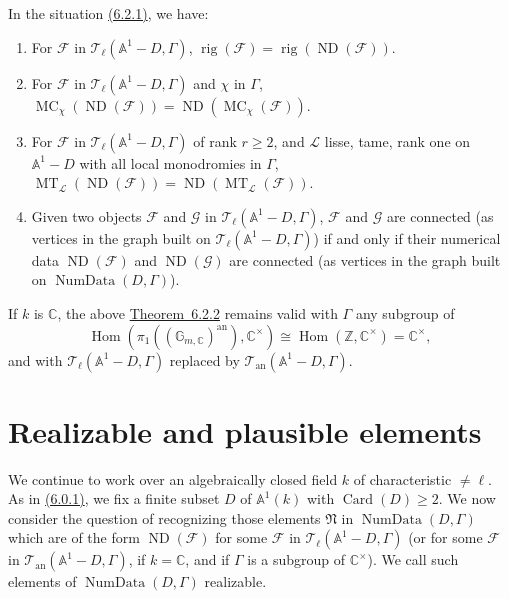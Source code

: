 In the situation \hyperref[par:6.2.1]{(6.2.1)}, we have:
\begin{enumerate}[label=(\arabic*)]
\item For \(\mathcal{F}\) in \(\mathcal{T}_\ell(\mathbb{A}^1-D,\Gamma)\), \(\operatorname{rig}(\mathcal{F})=\operatorname{rig}(\operatorname{ND}(\mathcal{F}))\).
\item For \(\mathcal{F}\) in \(\mathcal{T}_\ell(\mathbb{A}^1-D,\Gamma)\) and \(\chi\) in \(\Gamma\), \(\operatorname{MC}_\chi(\operatorname{ND}(\mathcal{F}))=\operatorname{ND}(\operatorname{MC}_\chi(\mathcal{F}))\).
\item For \(\mathcal{F}\) in \(\mathcal{T}_\ell(\mathbb{A}^1-D,\Gamma)\) of rank \(r\geq 2\), and \(\mathcal{L}\) lisse, tame, rank one on \(\mathbb{A}^1-D\) with all local monodromies in \(\Gamma\), \(\operatorname{MT}_{\mathcal{L}}(\operatorname{ND}(\mathcal{F}))=\operatorname{ND}(\operatorname{MT}_{\mathcal{L}}(\mathcal{F}))\).
\item Given two objects \(\mathcal{F}\) and \(\mathcal{G}\) in \(\mathcal{T}_\ell(\mathbb{A}^1-D,\Gamma)\), \(\mathcal{F}\) and \(\mathcal{G}\) are connected (as vertices in the graph built on \(\mathcal{T}_\ell(\mathbb{A}^1-D,\Gamma)\)) if and only if their numerical data \(\operatorname{ND}(\mathcal{F})\) and \(\operatorname{ND}(\mathcal{G})\) are connected (as vertices in the graph built on \(\operatorname{NumData}(D,\Gamma)\)).
\end{enumerate}

If \(k\) is \(\mathbb{C}\), the above \hyperref[thm:6.2.2]{Theorem~6.2.2} remains valid with \(\Gamma\) any subgroup of
\[
\operatorname{Hom}(\pi_1((\mathbb{G}_{m,\mathbb{C}})^{\mathrm{an}}),\mathbb{C}^{\times})\cong\operatorname{Hom}(\mathbb{Z},\mathbb{C}^{\times})=\mathbb{C}^{\times},
\]
and with \(\mathcal{T}_\ell(\mathbb{A}^1-D,\Gamma)\) replaced by \(\mathcal{T}_{\mathrm{an}}(\mathbb{A}^1-D,\Gamma)\).

\section{Realizable and plausible elements}
\label{sec:6.3}

We continue to work over an algebraically closed field \(k\) of characteristic \(\ne\ell\). As in \hyperref[par:6.0.1]{(6.0.1)}, we fix a finite subset \(D\) of \(\mathbb{A}^1(k)\) with \(\operatorname{Card}(D)\geq 2\). We now consider the question of recognizing those elements \(\mathfrak{N}\) in \(\operatorname{NumData}(D,\Gamma)\) which are of the form \(\operatorname{ND}(\mathcal{F})\) for some \(\mathcal{F}\) in \(\mathcal{T}_\ell(\mathbb{A}^1-D,\Gamma)\) (or for some \(\mathcal{F}\) in \(\mathcal{T}_{\mathrm{an}}(\mathbb{A}^1-D,\Gamma)\), if \(k=\mathbb{C}\), and if \(\Gamma\) is a subgroup of \(\mathbb{C}^{\times}\)). We call such elements of \(\operatorname{NumData}(D,\Gamma)\) realizable.

